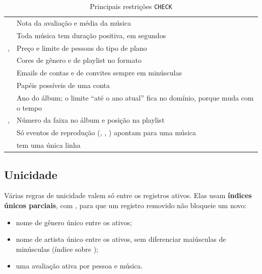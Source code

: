\begin{table}[htbp]
  \centering
  \caption{Principais restrições \texttt{CHECK}}
  \label{tab:checks}
  \small
  \begin{tabularx}{\textwidth}{@{}L{0.9}L{1.1}@{}}
    \toprule
     &  \\
    \midrule
     & Nota da avaliação e média da música \\
     & Toda música tem duração positiva, em segundos \\
    ,  & Preço e limite de pessoas do tipo de plano \\
     & Cores de gênero e de playlist no formato  \\
     & Emails de contas e de convites sempre em minúsculas \\
     & Papéis possíveis de uma conta \\
     & Ano do álbum; o limite ``até o ano atual'' fica no domínio, porque muda com o tempo \\
    ,  & Número da faixa no álbum e posição na playlist \\
     & Só eventos de reprodução (, , ) apontam para uma música \\
     &  tem uma única linha \\
    \bottomrule
  \end{tabularx}
\end{table}

\FloatBarrier
\subsection{Unicidade}

Várias regras de unicidade valem só entre os registros ativos. Elas usam
\textbf{índices únicos parciais}, com , para
que um registro removido não bloqueie um novo:

\begin{itemize}
  \item nome de gênero único entre os ativos;
  \item nome de artista único entre os ativos, sem diferenciar maiúsculas de
    minúsculas (índice sobre );
  \item uma avaliação ativa por pessoa e música.
\end{itemize}


